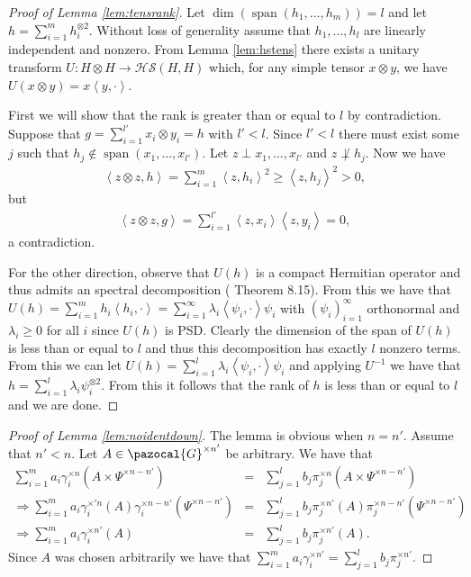 \documentclass[aos,preprint]{imsart}
\def\l{\left}
\def\r{\right}
\def\sG{\pazocal{G}}
\def\hs{\mathscr{HS}}
\def\spn{\operatorname{span}}
\theoremstyle{plain}
\theoremstyle{defintion}
\begin{document}
	\begin{proof}[Proof of Lemma \ref{lem:tensrank}]
		Let $\dim\left( \spn\left( h_1,\ldots,h_m \right) \right)= l$ and let $h = \sum_{i=1}^m h_i^{\otimes 2}$. Without loss of generality assume that $h_1,\ldots,h_l$ are linearly independent and nonzero. From Lemma \ref{lem:hstens} there exists a unitary transform  $U:H\otimes H \to \hs\left( H,H \right)$ which, for any simple tensor $x\otimes y$, we have $U(x\otimes y) = x\l<y,\cdot\r>$.

		First we will show that the rank is greater than or equal to $l$ by contradiction. Suppose that $g = \sum_{i=1}^{l'}x_i \otimes y_i = h$ with $l'<l$. Since $l'<l$ there must exist some $j$ such that $h_j \notin \spn\left( x_1,\ldots,x_{l'} \right)$. Let $z\perp x_1,\ldots,x_{l'}$ and $z \not\perp h_j$. Now we have
		\begin{eqnarray*}
			\l<z\otimes z, h\r> = \sum_{i=1}^m \l<z,h_i\r>^2 \ge \l<z,h_j\r>^2 > 0,
		\end{eqnarray*}
		but 
		\begin{eqnarray*}
			\l<z\otimes z, g\r> = \sum_{i=1}^{l'} \l<z,x_i\r> \l<z, y_i\r> = 0,
		\end{eqnarray*}
		a contradiction.

		For the other direction, observe that $U(h)$ is a compact Hermitian operator and thus admits an spectral decomposition (\cite{introhilb} Theorem 8.15). From this we have that $U(h) = \sum_{i=1}^m h_i \l<h_i,\cdot\r> =  \sum_{i=1}^\infty \lambda_i \l<\psi_i, \cdot\r> \psi_i$  with $\left( \psi_i \right)_{i=1}^\infty$ orthonormal and $\lambda_i\ge 0$ for all $i$ since $U(h)$ is PSD. Clearly the dimension of the span of $U\left( h \right) $ is less than or equal to $ l$ and thus this decomposition has exactly $l$ nonzero terms. From this we can let $U(h) = \sum_{i=1}^l \lambda_i \l<\psi_i, \cdot\r> \psi_i$ and applying $U^{-1}$ we have that $h=\sum_{i=1}^l \lambda_i \psi_i^{\otimes 2}$. From this it follows that the rank of $h$ is less than or equal to $l$ and we are done.
	\end{proof}
	\begin{proof}[Proof of Lemma \ref{lem:noidentdown}]
		The lemma is obvious when $n=n'$. Assume that $n'<n$. Let $A \in \sG^{\times n'}$ be arbitrary. We have that 
		\begin{eqnarray*}
			\sum_{i=1}^m a_i \gamma_i^{\times n}\left( A\times \Psi^{\times n-n'} \right) &=&  \sum_{j=1}^l b_j \pi_j^{\times n}\left( A\times \Psi^{\times n-n'} \right)\\
			\Rightarrow \sum_{i=1}^m a_i \gamma_i^{\times 'n}\left( A\right) \gamma_i^{\times n-n'}\left( \Psi^{\times n-n'} \right) &=&  \sum_{j=1}^l b_j \pi_j^{\times n'}\left( A\right) \pi_j^{\times n- n'}\left( \Psi^{\times n-n'} \right)\\
			\Rightarrow \sum_{i=1}^m a_i \gamma_i^{\times n'}\left( A\right) &=&  \sum_{j=1}^l b_j \pi_j^{\times n'}\left( A\right).
		\end{eqnarray*}
		Since $A$ was chosen arbitrarily we have that $\sum_{i=1}^m a_i \gamma_i^{\times n'} =  \sum_{j=1}^l b_j \pi_j^{\times n'}$.
	\end{proof}
\end{document}
